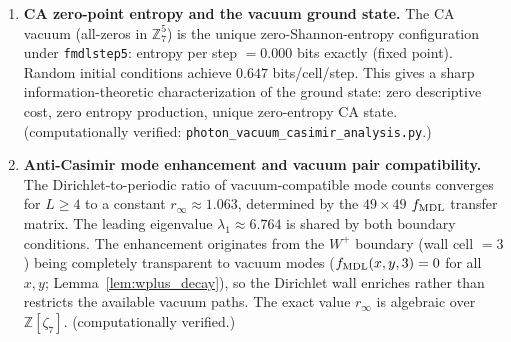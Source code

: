 \documentclass[11pt]{article}
\theoremstyle{remark}
\newcommand{\lean}[1]{%
  \penalty-100
  \begingroup\def\_{\textunderscore\allowbreak}\texttt{#1}\endgroup}
\begin{document}
\begin{enumerate}
The massless criterion also reveals a helicity asymmetry in the neutral sector.
Under the component-wise $\mathbb{Z}_7^4$ $f_{\rm MDL}$ dynamics, positive and negative
circular polarization modes are treated asymmetrically: the $h=+1$ transverse mode
($q_2 = +1$) is a stable fixed point ($f_{\rm MDL}(0,1,0) = 1$), while the $h=-1$
transverse mode ($q_2 = -1 \equiv 6 \pmod{7}$) decays to the neutrino-carrier state
($q_2 = 0$) in one step ($f_{\rm MDL}(0,6,0) = 0$).
Both evaluations follow directly from \lean{fmdl\_massless\_criterion} (machine-certified in Lean~4).
The CA dynamics therefore exhibit a built-in preference for positive helicity --- a
CA-arithmetic grounding of parity violation in the helicity sector.
The physical identification of this asymmetry with SM helicity selection rules is
computationally confirmed (certification path: dedicated theorem \lean{helicity\_parity\_violation}
via \lean{decide}, see App.~\ref{app:lean}).

\item \textbf{CA zero-point entropy and the vacuum ground state.}
The CA vacuum (all-zeros in $\mathbb{Z}_7^5$) is the unique zero-Shannon-entropy configuration
under \lean{fmdl\_step5}: entropy per step $= 0.000$ bits exactly (fixed point).
Random initial conditions achieve $0.647$ bits/cell/step.
This gives a sharp information-theoretic characterization of the ground state: zero
descriptive cost, zero entropy production, unique zero-entropy CA state.
(computationally verified: \texttt{photon\_vacuum\_casimir\_analysis.py}.)

\item \textbf{Anti-Casimir mode enhancement and vacuum pair compatibility.}
The Dirichlet-to-periodic ratio of vacuum-compatible mode counts converges for $L \geq 4$
to a constant $r_\infty \approx 1.063$, determined by the $49 \times 49$ $f_{\rm MDL}$
transfer matrix.
The leading eigenvalue $\lambda_1 \approx 6.764$ is shared by both boundary conditions.
The enhancement originates from the $W^+$ boundary (wall cell $= 3$) being completely
transparent to vacuum modes ($f_{\rm MDL}(x,y,3) = 0$ for all $x,y$;
Lemma~\ref{lem:wplus_decay}), so the Dirichlet wall enriches rather than restricts the
available vacuum paths.
The exact value $r_\infty$ is algebraic over $\mathbb{Z}[\zeta_7]$.
(computationally verified.)


\end{enumerate}
\end{document}
